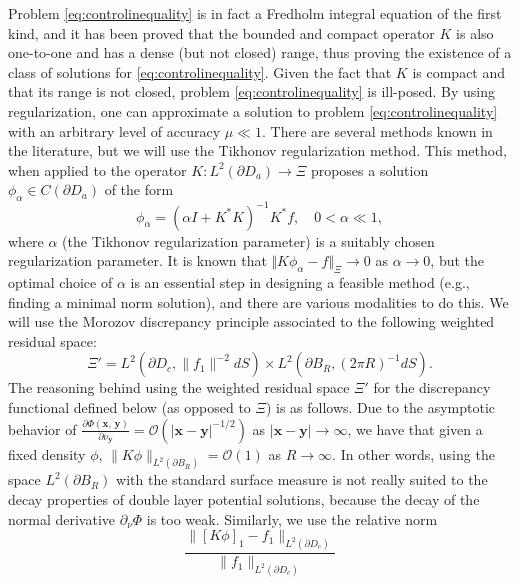 \documentclass[11pt]{amsart}
\theoremstyle{definition}
\theoremstyle{definition}
\theoremstyle{definition}
\begin{document}
Problem \eqref{eq:controlinequality} is in fact a Fredholm integral equation of the first kind, and it has been proved that the bounded and compact operator $K$ is also one-to-one and has a dense (but not closed) range, thus proving the existence of a class of solutions for \eqref{eq:controlinequality}. Given the fact that $K$ is compact and that its range is not closed, problem \eqref{eq:controlinequality} is ill-posed. By using regularization, one can approximate a solution to problem \eqref{eq:controlinequality} with an arbitrary level of accuracy $\mu \ll 1$. There are several methods known in the literature, but we will use the Tikhonov regularization method. This method, when applied to the operator $K:L^2(\partial D_a)\rightarrow \Xi$ proposes a solution $\phi_{\alpha}\in C(\partial D_{a})$ of the form 
\begin{equation}
\label{Tikhonov}
\phi_{\alpha}=(\alpha I+K^*K)^{-1}K^*f, \quad 0<\alpha \ll 1,
\end{equation}
where $\alpha$ (the Tikhonov regularization parameter) is a suitably chosen regularization parameter. It is known that $\Vert K\phi_\alpha-f\Vert_\Xi\rightarrow 0$ as $\alpha\rightarrow 0$, but the optimal choice of $\alpha$ is an essential step in designing a feasible method (e.g., finding a minimal norm solution), and there are various modalities to do this. We will use the Morozov discrepancy principle associated to the following weighted residual space:
\begin{equation}
\label{space-Xi'}
\Xi' = L^{2}(\partial D_{c}, \|f_{1}\|^{-2}dS) \times L^{2}(\partial B_{R}, (2\pi R)^{-1}dS).
\end{equation}
The reasoning behind using the weighted residual space $\Xi'$ for the discrepancy functional defined below (as opposed to $\Xi$) is as follows. Due to the asymptotic behavior of $\frac{\partial \Phi(\mathbf{x},\, \mathbf{y})}{\partial \nu_{\mathbf{y}}} = \mathcal{O}(|\mathbf{x}-\mathbf{y}|^{-1/2})$ as $|\mathbf{x}-\mathbf{y}| \to \infty$, we have that given a fixed density $\phi$, $\|K\phi\|_{L^{2}(\partial B_{R})} = \mathcal{O}(1)$ as $R \to \infty$. In other words, using the space $L^{2}(\partial B_{R})$ with the standard surface measure is not really suited to the decay properties of double layer potential solutions, because the decay of the normal derivative $\partial_{\nu}\Phi$ is too weak. Similarly, we use the relative norm
\begin{equation}
\label{eq:F1}
\frac{\|[K\phi]_{1} - f_{1}\|_{L^{2}(\partial D_{c})}}{\|f_{1}\|_{L^{2}(\partial D_{c})}}
\end{equation}
\end{document}

